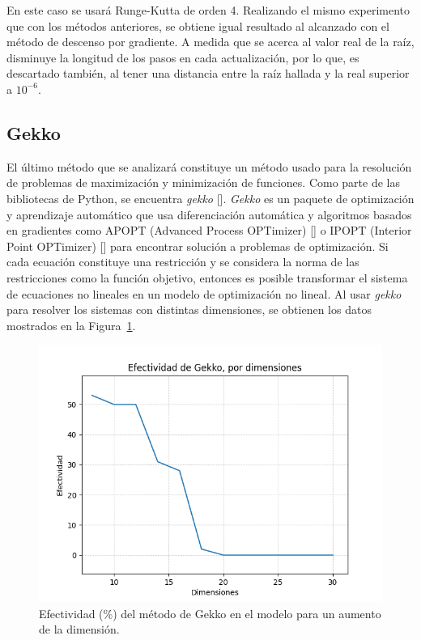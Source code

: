 \par En este caso se usar\'a Runge-Kutta de orden 4. Realizando el mismo experimento que con los m\'etodos anteriores, se obtiene igual resultado al alcanzado con el m\'etodo de descenso por gradiente. A medida que se acerca al valor real de la ra\'iz, disminuye la longitud de los pasos en cada actualizaci\'on, por lo que, es descartado tambi\'en, al tener una distancia entre la ra\'iz hallada y la real superior a $10^{-6}$.\\

\subsection{Gekko}

\par El \'ultimo m\'etodo que se analizar\'a constituye un m\'etodo usado para la resoluci\'on de problemas de maximizaci\'on y minimizaci\'on de funciones. Como parte de las bibliotecas de Python, se encuentra \textit{gekko} [\cite{13}]. \textit{Gekko} es un paquete de optimizaci\'on y aprendizaje autom\'atico que usa diferenciaci\'on autom\'atica y algoritmos basados en gradientes como APOPT (Advanced Process OPTimizer) [\cite{25}] o IPOPT (Interior Point OPTimizer) [\cite{26}] para encontrar soluci\'on a problemas de optimizaci\'on. Si cada ecuaci\'on constituye una restricci\'on y se considera la norma de las restricciones como la funci\'on objetivo, entonces es posible transformar el sistema de ecuaciones no lineales en un modelo de optimizaci\'on no lineal. Al usar \textit{gekko} para resolver los sistemas con distintas dimensiones, se obtienen los datos mostrados en la Figura~\ref{Gekko}.\\

\begin{figure}[h]
\center
\includegraphics[scale=.4]{Graphics/Gekko.png}
\caption{Efectividad (\%) del m\'etodo de Gekko en el modelo para un aumento de la dimensi\'on.}
\label{Gekko}
\end{figure}

